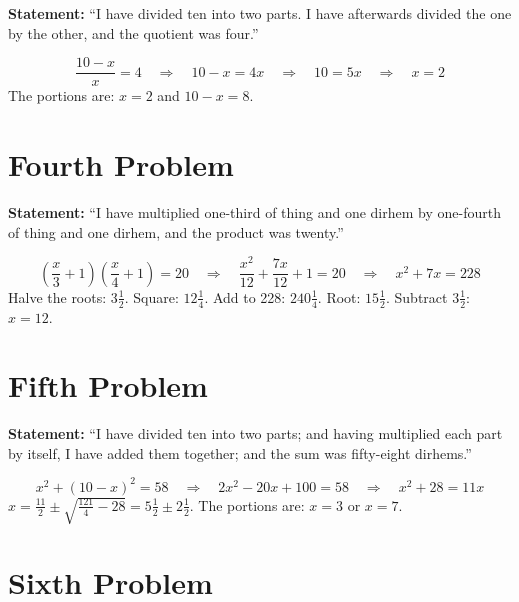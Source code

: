 \documentclass[11pt,a4paper,openany,oneside]{book}
\begin{document}
\textbf{Statement:} ``I have divided ten into two parts. I have afterwards
divided the one by the other, and the quotient was four.''

\begin{mathbox}
\begin{equation}
\frac{10 - x}{x} = 4 \quad\Rightarrow\quad 10 - x = 4x \quad\Rightarrow\quad 10 = 5x \quad\Rightarrow\quad x = 2
\end{equation}
The portions are: $x = 2$ and $10 - x = 8$.
\end{mathbox}

\section*{Fourth Problem}

\textbf{Statement:} ``I have multiplied one-third of thing and one dirhem by
one-fourth of thing and one dirhem, and the product was twenty.''

\begin{mathbox}
\begin{equation}
\left(\frac{x}{3} + 1\right)\left(\frac{x}{4} + 1\right) = 20
\quad\Rightarrow\quad \frac{x^2}{12} + \frac{7x}{12} + 1 = 20
\quad\Rightarrow\quad x^2 + 7x = 228
\end{equation}
Halve the roots: $3\frac{1}{2}$. Square: $12\frac{1}{4}$. Add to 228: $240\frac{1}{4}$.
Root: $15\frac{1}{2}$. Subtract $3\frac{1}{2}$: $x = 12$.
\end{mathbox}

\section*{Fifth Problem}

\textbf{Statement:} ``I have divided ten into two parts; and having
multiplied each part by itself, I have added them together; and the sum was
fifty-eight dirhems.''

\begin{mathbox}
\begin{equation}
x^2 + (10-x)^2 = 58 \quad\Rightarrow\quad 2x^2 - 20x + 100 = 58
\quad\Rightarrow\quad x^2 + 28 = 11x
\end{equation}
$x = \frac{11}{2} \pm \sqrt{\frac{121}{4} - 28} = 5\frac{1}{2} \pm 2\frac{1}{2}$.
The portions are: $x = 3$ or $x = 7$.
\end{mathbox}

\section*{Sixth Problem}
\end{document}
